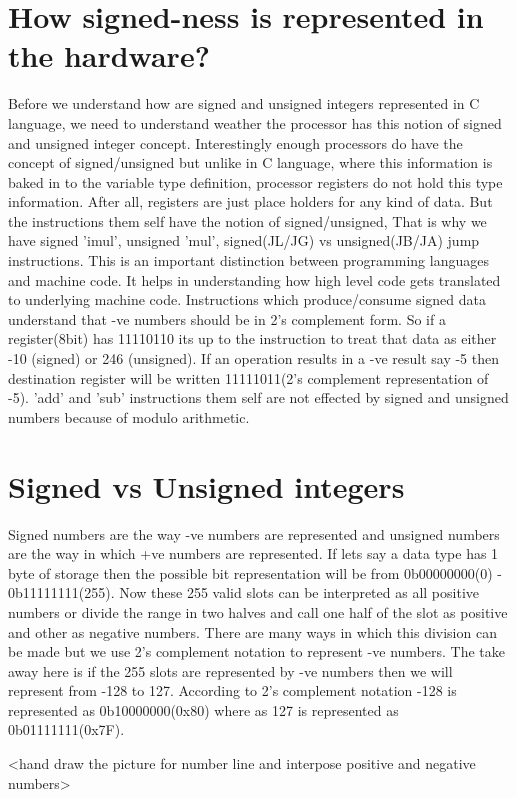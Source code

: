 \documentclass{article}
\begin{document}
\section{How signed-ness is represented in the hardware?}
Before we understand how are signed and unsigned integers represented in C
language, we need to
understand weather the processor has this notion of signed and unsigned
integer concept. Interestingly enough processors do have the concept of
signed/unsigned but unlike in C language, where this information is baked in to
the variable type definition, processor registers do not hold this type
information. After all, registers are just place holders for any kind of
data. But the instructions them self have the notion of signed/unsigned, That
is why we have signed 'imul', unsigned 'mul', signed(JL/JG) vs unsigned(JB/JA)
jump instructions. This is an important distinction between programming
languages and machine code. It helps in understanding how high level code gets
translated to underlying machine code. Instructions which produce/consume signed
data understand that -ve numbers should be in 2's complement form. So if a
register(8bit) has 11110110 its up to the instruction to treat that data as
either -10 (signed) or 246 (unsigned). If an operation results in a -ve result
say -5 then destination register will be written 11111011(2's complement
representation of -5). 'add' and 'sub' instructions them self are not effected
by signed and unsigned numbers because of modulo arithmetic.

\section{Signed vs Unsigned integers}
Signed numbers are the way -ve numbers are represented and unsigned numbers are
the way in which +ve numbers are represented. If lets say a data type has 1
byte of storage then the possible bit representation will be from  0b00000000(0)
- 0b11111111(255). Now these 255 valid slots can be interpreted as all positive
numbers or divide the range in two halves and call one half of the slot as
positive and other as negative numbers. There are many ways in which this
division can be made but we use 2's complement notation to represent -ve
numbers. The take away here is if the 255 slots are represented by -ve numbers
then we will represent from -128 to 127. According to 2's complement notation
-128 is represented as 0b10000000(0x80) where as 127 is represented as
0b01111111(0x7F).

<hand draw the picture for number line and interpose positive and negative
numbers>
\end{document}
